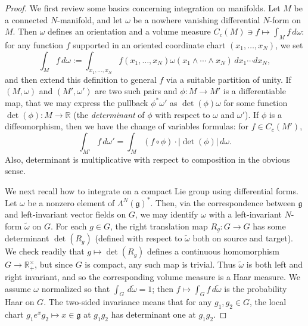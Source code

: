 \documentclass[reqno]{amsart} 
\begin{document}
\begin{proof}
  We first review some basics concerning integration on manifolds.  Let $M$ be a connected $N$-manifold, and let $\omega$ be a nowhere vanishing differential $N$-form on $M$.  Then $\omega$ defines an orientation and a volume measure $C_c(M) \ni f \mapsto \int_M f \, d \omega$: for any function $f$ supported in an oriented coordinate chart $(x_1,\dotsc,x_N)$, we set
  \begin{equation*}
    \int_M f \, d \omega :=
    \int_{x_1,\dotsc,x_N}
    f(x_1,\dotsc,x_N)
    \omega(x_1 \wedge \dotsb \wedge x_N)
    \, d x_1 \dotsb d x_N,
  \end{equation*}
  and then extend this definition to general $f$ via a suitable partition of unity.  If $(M,\omega)$ and $(M',\omega ')$ are two such pairs and $\phi : M \rightarrow M'$ is a differentiable map, that we may express the pullback $\phi^* \omega '$ as $\det(\phi) \omega$ for some function $\det(\phi) : M \rightarrow \mathbb{R}$ (the \emph{determinant} of $\phi$ with respect to $\omega$ and $\omega '$).  If $\phi$ is a diffeomorphism, then we have the change of variables formulas: for $f \in C_c(M')$,
  \begin{equation}\label{eq:change-of-vars}
    \int_{M'}
    f \, d \omega ' = \int_M (f \circ \phi) \cdot |\det(\phi)| \, d \omega.
  \end{equation}
  Also, determinant is multiplicative with respect to composition in the obvious sense.

  We next recall how to integrate on a compact Lie group using differential forms.  Let $\omega$ be a nonzero element of $\Lambda^N(\mathfrak{g})^*$.  Then, via the correspondence between $\mathfrak{g}$ and left-invariant vector fields on $G$, we may identify $\omega$ with a left-invariant $N$-form $\tilde{\omega}$ on $G$.  For each $g \in G$, the right translation map $R_g : G \rightarrow G$ has some determinant $\det(R_g)$ (defined with respect to $\tilde{\omega}$ both on source and target).  We check readily that $g \mapsto \det(R_g)$ defines a continuous homomorphism $G \rightarrow \mathbb{R}^\times_+$, but since $G$ is compact, any such map is trivial.  Thus $\tilde{\omega}$ is both left and right invariant, and so the corresponding volume measure is a Haar measure.  We assume $\omega$ normalized so that $\int_G \, d \tilde{\omega} = 1$; then $f \mapsto \int_G f \, d \tilde{\omega}$ is the probability Haar on $G$.  The two-sided invariance means that for any $g_1, g_2 \in G$, the local chart $g_1 e^x g_2 \mapsto x \in \mathfrak{g}$ at $g_1 g_2$ has determinant one at $g_1 g_2$.


\end{proof}
\end{document}
